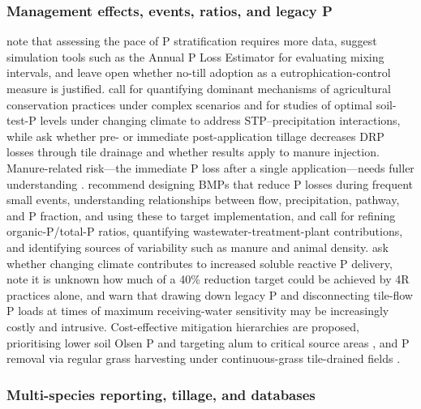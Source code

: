\documentclass[11pt]{article}
\begin{document}
\subsubsection{Management effects, events, ratios, and legacy P}

\textcite{Uusitalo2018} note that assessing the pace of P stratification requires more data, suggest simulation tools such as the Annual P Loss Estimator for evaluating mixing intervals, and leave open whether no-till adoption as a eutrophication-control measure is justified. \textcite{Ni2020} call for quantifying dominant mechanisms of agricultural conservation practices under complex scenarios and for studies of optimal soil-test-P levels under changing climate to address STP--precipitation interactions, while \textcite{Wang2018} ask whether pre- or immediate post-application tillage decreases DRP losses through tile drainage and whether results apply to manure injection. Manure-related risk---the immediate P loss after a single application---needs fuller understanding \parencite{Madison2014}. \textcite{Brendel2019} recommend designing BMPs that reduce P losses during frequent small events, understanding relationships between flow, precipitation, pathway, and P fraction, and using these to target implementation, and \textcite{Schilling2017b} call for refining organic-P/total-P ratios, quantifying wastewater-treatment-plant contributions, and identifying sources of variability such as manure and animal density. \textcite{Jarvie2017} ask whether changing climate contributes to increased soluble reactive P delivery, note it is unknown how much of a 40\% reduction target could be achieved by 4R practices alone, and warn that drawing down legacy P and disconnecting tile-flow P loads at times of maximum receiving-water sensitivity may be increasingly costly and intrusive. Cost-effective mitigation hierarchies are proposed, prioritising lower soil Olsen P and targeting alum to critical source areas \parencite{McDowell2015}, and P removal via regular grass harvesting under continuous-grass tile-drained fields \parencite{Zhang2015b}.

\subsubsection{Multi-species reporting, tillage, and databases}
\end{document}
